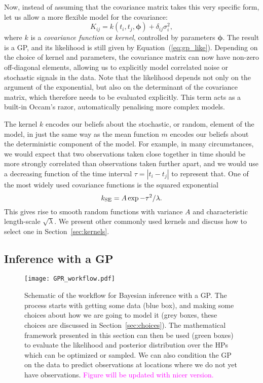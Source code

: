 \documentclass[letterpaper]{ar-1col}
\newcommand{\suz}[1]{\textcolor{magenta}{#1}}
\begin{document}
Now, instead of assuming that the covariance matrix takes this very specific form, let us allow a more flexible model for the covariance:
\begin{equation}
  K_{ij} = k(t_i,t_j,\boldsymbol{\phi}) + \delta_{ij} \sigma_i^2,
\end{equation}
where $k$ is a \emph{covariance function} or \emph{kernel}, controlled by parameters $\boldsymbol{\phi}$. The result is a GP, and its likelihood is still given by Equation~(\ref{eq:gp_like}). Depending on the choice of kernel and parameters, the covariance matrix can now have non-zero off-diagonal elements, allowing us to explicitly model correlated noise or stochastic signals in the data. 
Note that the likelihood depends not only on the argument of the exponential, but also on the determinant of the covariance matrix, which therefore needs to be evaluated explicitly. This term acts as a built-in Occam's razor, automatically penalising more complex models.

The kernel $k$ encodes our beliefs about the stochastic, or random, element of the model, in just the same way as the mean function $m$ encodes our beliefs about the deterministic component of the model. For example, in many circumstances, we would expect that two observations taken close together in time should be more strongly correlated than observations taken further apart, and we would use a decreasing function of the time interval $\tau=|t_i-t_j|$ to represent that. One of the most widely used covariance functions is the squared exponential 
\begin{equation}
    k_{\rm SE} = A \exp{-\tau^2/\lambda}.
\end{equation}
This gives rise to smooth random functions with variance $A$ and characteristic length-scale $\sqrt{\lambda}$. We present other commonly used kernels and discuss how to select one in Section~\ref{sec:kernels}.

\subsection{Inference with a GP}

\begin{figure}[h]
  \texttt{[image: GPR\_workflow.pdf]}
  \caption{Schematic of the workflow for Bayesian inference with a GP. The process starts with getting some data (blue box), and making some choices about how we are going to model it (grey boxes, these choices are discussed in Section~\ref{sec:choices}). The mathematical framework presented in this section can then be used (green boxes) to evaluate the likelihood and posterior distribution over the HPs which can be optimized or sampled. We can also condition the GP on the data to predict observations at locations where we do not yet have observations. \suz{Figure will be updated with nicer version.}}
  \label{fig:GPRworkflow}
\end{figure}
\end{document}
